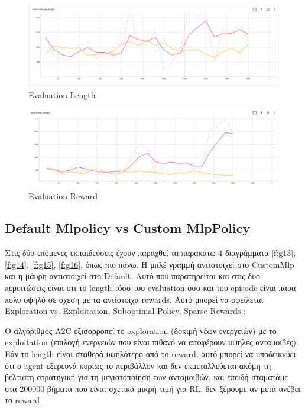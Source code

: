 \begin{figure}[ht]
	\centering
	\includegraphics[width=1\linewidth]{Results/A2C_CNN/eval_length.png}
	\caption{ Evaluation Length}
	\label{f:g11}	
\end{figure}

\begin{figure}[ht]
	\centering
	\includegraphics[width=1\linewidth]{Results/A2C_CNN/eval_reward.png}
	\caption{ Evaluation Reward}
	\label{f:g12}	
\end{figure}

\clearpage

\subsection{Default Mlpolicy vs Custom MlpPolicy}

Στις δύο επόμενες εκπαιδεύσεις έχουν παραχθεί τα παρακάτω 4 διαγράμματα \ref{f:g13}, \ref{f:g14}, \ref{f:g15}, \ref{f:g16}, όπως πιο πάνω.
Η μπλέ γραμμή αντιστοιχεί στο CustomMlp και η μάυρη αντιστοιχεί στο Default. Αυτό που παρατηρείται και στις δυο περιπτώσεις είναι οτι το length τόσο του evaluation όσο και του episode είναι παρα πολυ υψηλό σε σχεση με τα αντίστοιχα rewards. Αυτό μπορεί να οφείλεται
Exploration vs. Exploitation, Suboptimal Policy, Sparse Rewards :

Ο αλγόριθμος A2C εξισορροπεί το exploration (δοκιμή νέων ενεργειών) με το exploitation (επιλογή ενεργειών που είναι πιθανό να αποφέρουν υψηλές ανταμοιβές). Εάν το length είναι σταθερά υψηλότερο από το reward, αυτό μπορεί να υποδεικνύει ότι ο agent εξερευνά κυρίως το περιβάλλον και δεν εκμεταλλεύεται ακόμη τη βέλτιστη στρατηγική για τη μεγιστοποίηση των ανταμοιβών, και επειδή σταματάμε στα 200000 βήματα που είναι σχετικά μικρή τιμή για RL, δεν ξέρουμε αν μετά ανέβει το reward

